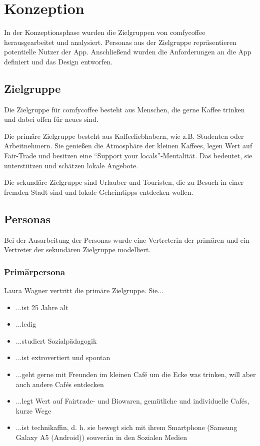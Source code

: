 \chapter{Konzeption}
\label{konzeption}
In der Konzeptionsphase wurden die Zielgruppen von comfycoffee herausgearbeitet und analysiert. Personas aus der Zielgruppe repräsentieren potentielle Nutzer der App. Anschließend wurden die Anforderungen an die App definiert und das Design entworfen.

\section{Zielgruppe}
Die Zielgruppe für comfycoffee besteht aus Menschen, die gerne Kaffee trinken und dabei offen für neues sind.

Die primäre Zielgruppe besteht aus Kaffeeliebhabern, wie z.B. Studenten oder Arbeitnehmern. Sie genießen die Atmosphäre der kleinen Kaffees, legen Wert auf Fair-Trade und besitzen eine ``Support your locals''-Mentalität. Das bedeutet, sie unterstützen und schätzen lokale Angebote.

Die sekundäre Zielgruppe sind Urlauber und Touristen, die zu Besuch in einer fremden Stadt sind und lokale Geheimtipps entdecken wollen.

\section{Personas}
Bei der Ausarbeitung der Personas wurde eine Vertreterin der primären und ein Vertreter der sekundären Zielgruppe modelliert.

\subsection{Primärpersona}
Laura Wagner vertritt die primäre Zielgruppe. Sie...
\begin{itemize}
	\item ...ist 25 Jahre alt
	\item ...ledig
	\item ...studiert Sozialpädagogik
	\item ...ist extrovertiert und spontan
	\item ...geht gerne mit Freunden im kleinen Café um die Ecke was trinken, will aber auch andere Cafés entdecken
	\item ...legt Wert auf Fairtrade- und Biowaren, gemütliche und individuelle Cafés, kurze Wege
	\item ...ist technikaffin, d. h. sie bewegt sich mit ihrem Smartphone (Samsung Galaxy A5 (Android)) souverän in den Sozialen Medien
\end{itemize}

